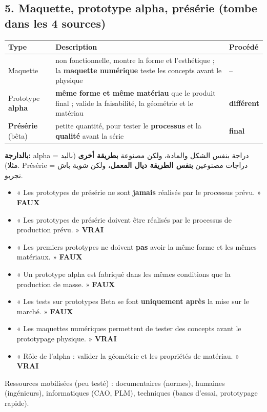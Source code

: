 \documentclass[11pt,a4paper]{article}
\newcommand{\fr}[1]{\textfrench{#1}}
\newcommand{\vrai}{\textcolor{vert}{\textbf{VRAI}}}
\newcommand{\faux}{\textcolor{rouge}{\textbf{FAUX}}}
\begin{document}
\subsection*{5. Maquette, prototype alpha, présérie \quad (tombe dans les 4 sources)}
\begin{center}
\begin{tabularx}{\linewidth}{l X l}
\toprule
\textbf{Type} & \textbf{Description} & \textbf{Procédé} \\
\midrule
Maquette & non fonctionnelle, montre la forme et l'esthétique ; la \textbf{maquette numérique} teste les concepts avant le physique & -- \\
Prototype \textbf{alpha} & \textbf{même forme et même matériau} que le produit final ; valide la faisabilité, la géométrie et le matériau & \textbf{différent} \\
\textbf{Présérie} (bêta) & petite quantité, pour tester le \textbf{processus} et la \textbf{qualité} avant la série & \textbf{final} \\
\bottomrule
\end{tabularx}
\end{center}
\par\begin{Arabic}
\textbf{بالدارجة:} \fr{alpha} = دراجة بنفس الشكل والمادة، ولكن مصنوعة \textbf{بطريقة أخرى} (باليد مثلا). \fr{Présérie} = دراجات مصنوعين \textbf{بنفس الطريقة ديال المعمل}، ولكن شوية باش نجربو.
\end{Arabic}
\begin{piege}
\begin{itemize}
\item « Les prototypes de présérie ne sont \textbf{jamais} réalisés par le processus prévu. » \faux
\item « Les prototypes de présérie doivent être réalisés par le processus de production prévu. » \vrai
\item « Les premiers prototypes ne doivent \textbf{pas} avoir la même forme et les mêmes matériaux. » \faux
\item « Un prototype alpha est fabriqué dans les mêmes conditions que la production de masse. » \faux
\item « Les tests sur prototypes Beta se font \textbf{uniquement après} la mise sur le marché. » \faux
\item « Les maquettes numériques permettent de tester des concepts avant le prototypage physique. » \vrai
\item « Rôle de l'alpha : valider la géométrie et les propriétés de matériau. » \vrai
\end{itemize}
\end{piege}
Ressources mobilisées (peu testé) : documentaires (normes), humaines (ingénieurs), informatiques (CAO, PLM), techniques (bancs d'essai, prototypage rapide).
\end{document}

